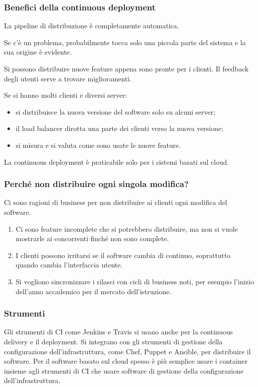 \subsubsection{Benefici della continuous deployment}
\begin{description}[leftmargin=0pt, style=unboxed]
  \item[Costi ridotti.] La pipeline di distribuzione è completamente automatica.
  \item[Problemi risolti più in fretta.] Se c'è un problema, probabilmente tocca solo una piccola parte del sistema e
    la sua origine è evidente.
  \item[Feedback dei clienti più veloce.] Si possono distribuire nuove feature appena sono pronte per i clienti. Il
    feedback degli utenti serve a trovare miglioramenti.
  \item[A/B testing.] Se si hanno molti clienti e diversi server:
    \begin{itemize}
      \item si distribuisce la nuova versione del software solo su alcuni server;
      \item il load balancer dirotta una parte dei clienti verso la nuova versione;
      \item si misura e si valuta come sono usate le nuove feature.
    \end{itemize}
\end{description}
La continuous deployment è praticabile solo per i sistemi basati sul cloud.

\subsubsection{Perché non distribuire ogni singola modifica?}
Ci sono ragioni di business per non distribuire ai clienti ogni modifica del software.
\begin{enumerate}
  \item Ci sono feature incomplete che si potrebbero distribuire, ma non si vuole mostrarle ai concorrenti finché non
    sono complete.
  \item I clienti possono irritarsi se il software cambia di continuo, soprattutto quando cambia l'interfaccia utente.
  \item Si vogliono sincronizzare i rilasci con cicli di business noti, per esempio l'inizio dell'anno accademico per
    il mercato dell'istruzione.
\end{enumerate}

\subsubsection{Strumenti}
Gli strumenti di CI come Jenkins e Travis si usano anche per la continuous delivery e il deployment. Si integrano con gli
strumenti di gestione della configurazione dell'infrastruttura, come Chef, Puppet e Ansible, per distribuire il
software. Per il software basato sul cloud spesso è più semplice usare i container insieme agli strumenti di CI che
usare software di gestione della configurazione dell'infrastruttura.

